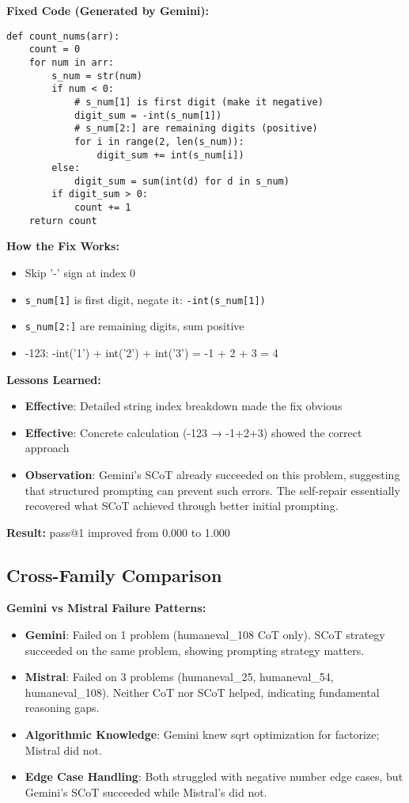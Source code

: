 \documentclass[11pt]{article}
\begin{document}
\textbf{Fixed Code (Generated by Gemini):}
\begin{lstlisting}
def count_nums(arr):
    count = 0
    for num in arr:
        s_num = str(num)
        if num < 0:
            # s_num[1] is first digit (make it negative)
            digit_sum = -int(s_num[1])
            # s_num[2:] are remaining digits (positive)
            for i in range(2, len(s_num)):
                digit_sum += int(s_num[i])
        else:
            digit_sum = sum(int(d) for d in s_num)
        if digit_sum > 0:
            count += 1
    return count
\end{lstlisting}

\textbf{How the Fix Works:}
\begin{itemize}
    \item Skip '-' sign at index 0
    \item \texttt{s\_num[1]} is first digit, negate it: \texttt{-int(s\_num[1])}
    \item \texttt{s\_num[2:]} are remaining digits, sum positive
    \item -123: -int('1') + int('2') + int('3') = -1 + 2 + 3 = 4
\end{itemize}

\textbf{Lessons Learned:}
\begin{itemize}
    \item \textbf{Effective}: Detailed string index breakdown made the fix obvious
    \item \textbf{Effective}: Concrete calculation (-123 → -1+2+3) showed the correct approach
    \item \textbf{Observation}: Gemini's SCoT already succeeded on this problem, suggesting that structured prompting can prevent such errors. The self-repair essentially recovered what SCoT achieved through better initial prompting.
\end{itemize}

\textbf{Result:} pass@1 improved from 0.000 to 1.000

\subsection{Cross-Family Comparison}

\textbf{Gemini vs Mistral Failure Patterns:}

\begin{itemize}
    \item \textbf{Gemini}: Failed on 1 problem (humaneval\_108 CoT only). SCoT strategy succeeded on the same problem, showing prompting strategy matters.
    
    \item \textbf{Mistral}: Failed on 3 problems (humaneval\_25, humaneval\_54, humaneval\_108). Neither CoT nor SCoT helped, indicating fundamental reasoning gaps.
    
    \item \textbf{Algorithmic Knowledge}: Gemini knew sqrt optimization for factorize; Mistral did not.
    
    \item \textbf{Edge Case Handling}: Both struggled with negative number edge cases, but Gemini's SCoT succeeded while Mistral's did not.
\end{itemize}
\end{document}
